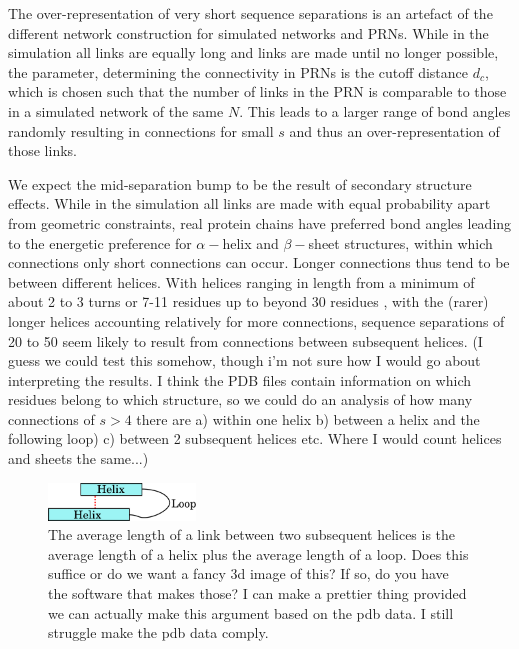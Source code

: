 \documentclass[reprint,amsmath,amssymb,rmp,onecolumn,notitlepage,11pt]{revtex4-1}
\newcommand{\red}[1]{\textcolor{red!80!black}{#1}}
\newcommand{\green}[1]{\textcolor{green!70!black}{#1}}
\newcommand{\gray}[1]{\textcolor{gray!80!black}{#1}}
\begin{document}
The over-representation of very short sequence separations is an artefact of the different network construction for simulated networks and PRNs. While in the simulation all links are equally long and links are made until no longer possible, the parameter, determining the connectivity in PRNs is the cutoff distance $d_c$, which is chosen such that the number of links in the PRN is comparable to those in a simulated network of the same $N$. This leads to a larger range of bond angles randomly resulting in connections for small $s$ and thus an over-representation of those links.

\gray{We expect the mid-separation bump to be the result of secondary structure effects. While in the simulation all links are made with equal probability apart from geometric constraints, real protein chains have preferred bond angles leading to the energetic preference for $\alpha-$helix and $\beta-$sheet structures, within which connections only short connections can occur. Longer connections thus tend to be between different helices.
With helices ranging in length from a minimum of about 2 to 3 turns or 7-11 residues up to beyond 30 residues \cite{manning1988circular}, with the (rarer) longer helices accounting relatively for more connections, sequence separations of 20 to 50 seem likely to result from connections between subsequent helices. (I guess we could test this somehow, though i'm not sure how I would go about interpreting the results. I think the PDB files contain information on which residues belong to which structure, so we could do an analysis of how many connections of $s>4$ there are a) within one helix b) between a helix and the following loop) c) between 2 subsequent helices etc. Where I would count helices and sheets the same...)}
\begin{figure}[h]
        \centering
	\includegraphics[width=0.35\textwidth]{paper/figures/neighbouring_helices.pdf}
        \caption{\gray{The average length of a link between two subsequent helices is the average length of a helix plus the average length of a loop. \red{Does this suffice or do we want a fancy 3d image of this? If so, do you have the software that makes those?}
        \green{I can make a prettier thing provided we can actually make this argument based on the pdb data. I still struggle make the pdb data comply.}}
        }
        \label{fig:bumpexplain}
\end{figure}
\end{document}
